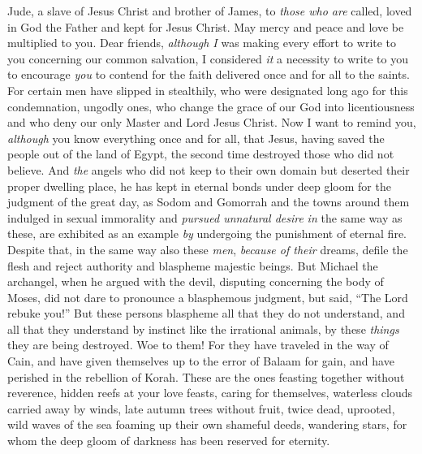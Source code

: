 
\begin{biblechapter} %
 Jude, a slave of Jesus Christ and brother of James, to \textit{those who are} called, loved in God the Father and kept for Jesus Christ.
\verse May mercy and peace and love be multiplied to you.
 Dear friends, \textit{although I} was making every effort to write to you concerning our common salvation, I considered \textit{it} a necessity to write to you to encourage \textit{you} to contend for the faith delivered once and for all to the saints.
\verse For certain men have slipped in stealthily, who were designated long ago for this condemnation, ungodly ones, who change the grace of our God into licentiousness and who deny our only Master and Lord Jesus Christ.
 Now I want to remind you, \textit{although} you know everything once and for all, that Jesus, having saved the people out of the land of Egypt, the second time destroyed those who did not believe.
\verse And \textit{the} angels who did not keep to their own domain but deserted their proper dwelling place, he has kept in eternal bonds under deep gloom for the judgment of the great day,
\verse as Sodom and Gomorrah and the towns around them indulged in sexual immorality and \textit{pursued unnatural desire} \textit{in} the same way as these, are exhibited as an example \textit{by} undergoing the punishment of eternal fire.
\verse Despite that, in the same way also these \textit{men}, \textit{because of their} dreams, defile the flesh and reject authority and blaspheme majestic beings.
\verse But Michael the archangel, when he argued with the devil, disputing concerning the body of Moses, did not dare to pronounce a blasphemous judgment, but said, “The Lord rebuke you!”
\verse But these persons blaspheme all that they do not understand, and all that they understand by instinct like the irrational animals, by these \textit{things} they are being destroyed.
\verse Woe to them! For they have traveled in the way of Cain, and have given themselves up to the error of Balaam for gain, and have perished in the rebellion of Korah.
\verse These are the ones feasting together without reverence, hidden reefs at your love feasts, caring for themselves, waterless clouds carried away by winds, late autumn trees without fruit, twice dead, uprooted,
\verse wild waves of the sea foaming up their own shameful deeds, wandering stars, for whom the deep gloom of darkness has been reserved for eternity.

\end{biblechapter}
